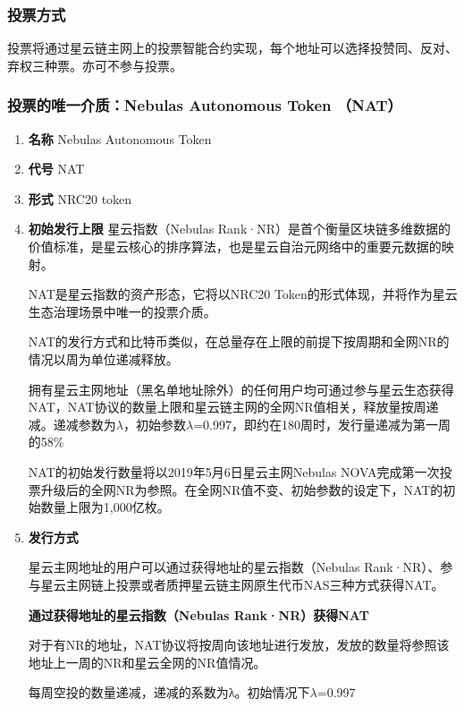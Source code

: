 \subsubsection{投票方式}

投票将通过星云链主网上的投票智能合约实现，每个地址可以选择投赞同、反对、弃权三种票。亦可不参与投票。

\subsubsection{投票的唯一介质：Nebulas Autonomous Token （NAT）}

\begin{enumerate}
	\item \textbf{名称}
	Nebulas Autonomous Token
		
	\item \textbf{代号}
	NAT

	\item  \textbf{形式}
	NRC20 token

	\item \textbf{初始发行上限}
	星云指数（Nebulas Rank·NR）是首个衡量区块链多维数据的价值标准，是星云核心的排序算法，也是星云自治元网络中的重要元数据的映射。
	
	NAT是星云指数的资产形态，它将以NRC20 Token的形式体现，并将作为星云生态治理场景中唯一的投票介质。
	
	NAT的发行方式和比特币类似，在总量存在上限的前提下按周期和全网NR的情况以周为单位递减释放。
	
	拥有星云主网地址（黑名单地址除外）的任何用户均可通过参与星云生态获得NAT，NAT协议的数量上限和星云链主网的全网NR值相关，释放量按周递减。递减参数为$λ$，初始参数$λ$=0.997，即约在180周时，发行量递减为第一周的58\% 
	
	NAT的初始发行数量将以2019年5月6日星云主网Nebulas NOVA完成第一次投票升级后的全网NR为参照。在全网NR值不变、初始参数的设定下，NAT的初始数量上限为1,000亿枚。

	\item \textbf{发行方式}
	
	星云主网地址的用户可以通过获得地址的星云指数（Nebulas Rank·NR）、参与星云主网链上投票或者质押星云链主网原生代币NAS三种方式获得NAT。

\textbf{通过获得地址的星云指数（Nebulas Rank·NR）获得NAT}

	对于有NR的地址，NAT协议将按周向该地址进行发放，发放的数量将参照该地址上一周的NR和星云全网的NR值情况。

	每周空投的数量递减，递减的系数为λ。初始情况下$λ$=0.997


\end{enumerate}
